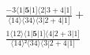 \documentclass[varwidth, border=5pt]{standalone}
\begin{document}
\begin{my}
$\begin{gathered}
\scriptscriptstyle\frac{-3⟨1|𝟓|1]⟨2|3+4|1]}{⟨14⟩⟨34⟩⟨3|2+4|1]} +\\
\scriptscriptstyle\frac{1⟨12⟩⟨1|𝟓|1]⟨4|2+3|1]}{⟨14⟩²⟨34⟩⟨3|2+4|1]} \phantom{+}
\end{gathered}$
\end{my}
\end{document}
